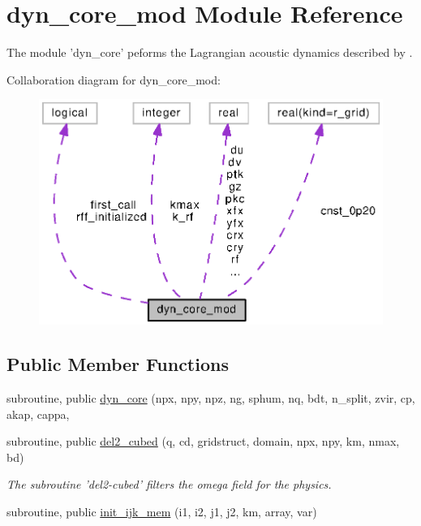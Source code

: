\section{dyn\-\_\-core\-\_\-mod Module Reference}
\label{classdyn__core__mod}


The module 'dyn\-\_\-core' peforms the Lagrangian acoustic dynamics described by \cite{lin2004vertically}.  




Collaboration diagram for dyn\-\_\-core\-\_\-mod\-:
\nopagebreak
\begin{figure}[H]
\begin{center}
\leavevmode
\includegraphics[width=348pt]{classdyn__core__mod__coll__graph}
\end{center}
\end{figure}
\subsection*{Public Member Functions}
\begin{DoxyCompactItemize}
\item 
subroutine, public \hyperlink{classdyn__core__mod_a05793faec17e66169e5f57f4b1a82033}{dyn\-\_\-core} (npx, npy, npz, ng, sphum, nq, bdt, n\-\_\-split, zvir, cp, akap, cappa,
\item 
subroutine, public \hyperlink{classdyn__core__mod_ad3018f7acb1006fc424bd0bcaad8b320}{del2\-\_\-cubed} (q, cd, gridstruct, domain, npx, npy, km, nmax, bd)
\begin{DoxyCompactList}\small\item\em The subroutine 'del2-\/cubed' filters the omega field for the physics. \end{DoxyCompactList}\item 
subroutine, public \hyperlink{classdyn__core__mod_a5311fb50c595143cbe4fc4d145532aa0}{init\-\_\-ijk\-\_\-mem} (i1, i2, j1, j2, km, array, var)
\end{DoxyCompactItemize}

